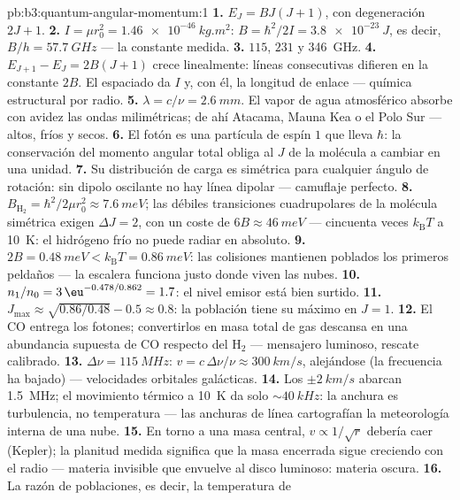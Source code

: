 \begin{solution}{pb:b3:quantum-angular-momentum:1}
\textbf{1.} $E_J = BJ(J+1)$, con degeneración $2J + 1$.
\textbf{2.} $I = \mu r_0^2 = \qty{1.46e-46}{kg.m^2}$: $B =
\hbar^2/2I = \qty{3.8e-23}{J}$, es decir, $B/h = \qty{57.7}{GHz}$ ---
la constante medida.
\textbf{3.} $115$, $231$ y \qty{346}{GHz}.
\textbf{4.} $E_{J+1} - E_J = 2B(J+1)$ crece linealmente: líneas
consecutivas difieren en la constante $2B$. El espaciado da $I$ y, con él,
la longitud de enlace --- química estructural por radio.
\textbf{5.} $\lambda = c/\nu = \qty{2.6}{mm}$. El vapor de agua
atmosférico absorbe con avidez las ondas milimétricas; de ahí Atacama, Mauna
Kea o el Polo Sur --- altos, fríos y secos.
\textbf{6.} El fotón es una partícula de espín $1$ que lleva $\hbar$:
la conservación del momento angular total obliga al $J$ de la molécula a
cambiar en una unidad.
\textbf{7.} Su distribución de carga es simétrica para cualquier ángulo de
rotación: sin dipolo oscilante no hay línea dipolar --- camuflaje
perfecto.
\textbf{8.} $B_{\text{H}_2} = \hbar^2/2\mu r_0^2 \approx
\qty{7.6}{meV}$; las débiles transiciones cuadrupolares de la molécula
simétrica exigen $\Delta J = 2$, con un coste de $6B \approx
\qty{46}{meV}$ --- cincuenta veces $k_{\text{B}}T$ a \qty{10}{K}: el
hidrógeno frío no puede radiar en absoluto.
\textbf{9.} $2B = \qty{0.48}{meV} < k_{\text{B}}T = \qty{0.86}{meV}$:
las colisiones mantienen poblados los primeros peldaños --- la escalera
funciona justo donde viven las nubes.
\textbf{10.} $n_1/n_0 = 3\,\eu^{-0.478/0.862} = 1.7$: el nivel emisor está
bien surtido.
\textbf{11.} $J_{\max} \approx \sqrt{0.86/0.48} - 0.5 \approx 0.8$:
la población tiene su máximo en $J = 1$.
\textbf{12.} El CO entrega los fotones; convertirlos en masa total de gas
descansa en una abundancia supuesta de CO respecto del H$_2$ --- mensajero
luminoso, rescate calibrado.
\textbf{13.} $\Delta\nu = \qty{115}{MHz}$: $v = c\,\Delta\nu/\nu
\approx \qty{300}{km/s}$, alejándose (la frecuencia ha bajado) ---
velocidades orbitales galácticas.
\textbf{14.} Los $\pm\qty{2}{km/s}$ abarcan \qty{1.5}{MHz}; el movimiento
térmico a \qty{10}{K} da solo $\sim\qty{40}{kHz}$: la anchura es
turbulencia, no temperatura --- las anchuras de línea cartografían la
meteorología interna de una nube.
\textbf{15.} En torno a una masa central, $v \propto 1/\sqrt r$ debería
caer (Kepler); la planitud medida significa que la masa encerrada sigue
creciendo con el radio --- materia invisible que envuelve al disco
luminoso: materia oscura.
\textbf{16.} La razón de poblaciones, es decir, la temperatura de

\end{solution}
